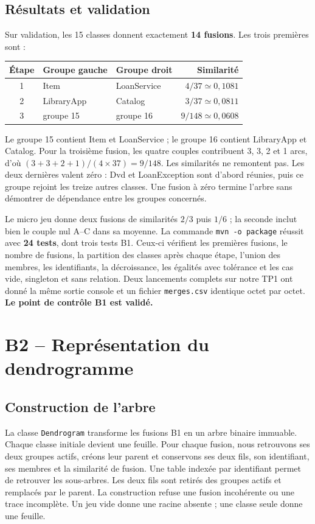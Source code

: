 \documentclass[11pt,a4paper]{article}
\begin{document}
\subsection{Résultats et validation}
Sur validation, les 15 classes donnent exactement \textbf{14 fusions}.
Les trois premières sont :
\begin{center}
\begin{tabular}{cllr}
Étape & Groupe gauche & Groupe droit & Similarité \\
\hline
1 & Item & LoanService & $4/37\simeq0{,}1081$ \\
2 & LibraryApp & Catalog & $3/37\simeq0{,}0811$ \\
3 & groupe 15 & groupe 16 & $9/148\simeq0{,}0608$
\end{tabular}
\end{center}
Le groupe 15 contient Item et LoanService ; le groupe 16 contient LibraryApp
et Catalog. Pour la troisième fusion, les quatre couples contribuent 3, 3, 2
et 1 arcs, d'où $(3+3+2+1)/(4\times37)=9/148$.
Les similarités ne remontent pas. Les deux dernières valent zéro : Dvd et
LoanException sont d'abord réunies, puis ce groupe rejoint les treize autres
classes. Une fusion à zéro termine l'arbre sans démontrer de dépendance entre
les groupes concernés.

Le micro jeu donne deux fusions de similarités $2/3$ puis $1/6$ ; la seconde
inclut bien le couple nul A--C dans sa moyenne.
La commande \texttt{mvn -o package} réussit avec \textbf{24 tests}, dont trois
tests B1. Ceux-ci vérifient les premières fusions, le nombre de fusions,
la partition des classes après chaque étape, l'union des membres, les
identifiants, la décroissance, les égalités avec tolérance et les cas vide,
singleton et sans relation.
Deux lancements complets sur notre TP1 ont donné la même sortie console et un
fichier \texttt{merges.csv} identique octet par octet.
\textbf{Le point de contrôle B1 est validé.}

\section{B2 -- Représentation du dendrogramme}
\subsection{Construction de l'arbre}
La classe \texttt{Dendrogram} transforme les fusions B1 en un arbre binaire
immuable. Chaque classe initiale devient une feuille. Pour chaque fusion,
nous retrouvons ses deux groupes actifs, créons leur parent et conservons
ses deux fils, son identifiant, ses membres et la similarité de fusion.
Une table indexée par identifiant permet de retrouver les sous-arbres.
Les deux fils sont retirés des groupes actifs et remplacés par le parent.
La construction refuse une fusion incohérente ou une trace incomplète.
Un jeu vide donne une racine absente ; une classe seule donne une feuille.
\end{document}
